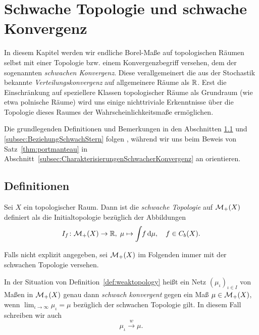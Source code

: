 \documentclass[../main/main.tex]{subfiles}
\begin{document}
	
	\section{Schwache Topologie und schwache Konvergenz}
	
	In diesem Kapitel werden wir endliche Borel-Maße auf topologischen Räumen selbst
	mit einer Topologie bzw. einem Konvergenzbegriff versehen, dem der sogenannten \emph{schwachen Konvergenz}. Diese
	verallgemeinert die aus der Stochastik bekannte \emph{Verteilungskonvergenz} auf allgemeinere Räume als $\mathbb{R}$. 
	Erst die Einschränkung auf speziellere Klassen topologischer Räume als Grundraum (wie etwa polnische Räume) wird uns einige nichttriviale Erkenntnisse 
	über die Topologie dieses Raumes der Wahrscheinlichkeitsmaße ermöglichen.
	
	Die grundlegenden Definitionen und Bemerkungen in den Abschnitten \ref{subsec:Definition} und \ref{subsec:BeziehungSchwachStern} folgen 
	\cite[Abschnitte 1-3]{Varadarajan.1958}, während wir uns beim Beweis von Satz~\ref{thm:portmanteau} in Abschnitt~\ref{subsec:CharakterisierungenSchwacherKonvergenz}
	an \cite[Satz 4.14.4]{Simon.2015} orientieren.

	\subsection{Definitionen}
	\label{subsec:Definition}
	
	\begin{Definition}
		\label{def:weaktopology}
		Sei $X$ ein topologischer Raum. Dann ist die \emph{schwache Topologie} auf $\mathcal{M}_{+}(X)$ definiert als die 
		Initialtopologie bezüglich der Abbildungen
		\[ I_f \colon \mathcal{M}_{+}(X) \to \mathbb{R}, \; \mu \mapsto \int_{} \, f \, \mathrm{d}\mu , \quad f \in C_b(X) \text{.} \]
	\end{Definition}

	Falls nicht explizit angegeben, sei $\mathcal{M}_{+}(X)$ im Folgenden immer mit der schwachen Topologie versehen.

	\begin{Definition}
		In der Situation von Definition~\ref{def:weaktopology} heißt ein Netz $(\mu_\iota)_{\iota \in I}$ von Maßen in $\mathcal{M}_{+}(X)$ genau dann 
		\emph{schwach konvergent} gegen ein Maß $\mu \in \mathcal{M}_{+}(X)$, wenn $\lim_{\iota \to \infty} \mu_\iota = \mu$ bezüglich der schwachen Topologie gilt.
		In diesem Fall schreiben wir auch
		\[ \mu_\iota \xrightarrow{w} \mu \text{.} \]
	\end{Definition}
\end{document}
